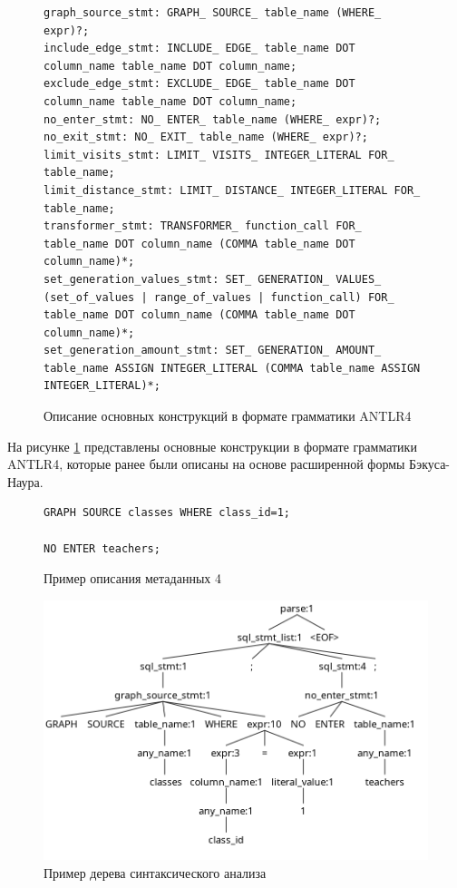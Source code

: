 \begin{figure}
  \begin{lstlisting}
graph_source_stmt: GRAPH_ SOURCE_ table_name (WHERE_ expr)?;
include_edge_stmt: INCLUDE_ EDGE_ table_name DOT column_name table_name DOT column_name;
exclude_edge_stmt: EXCLUDE_ EDGE_ table_name DOT column_name table_name DOT column_name;
no_enter_stmt: NO_ ENTER_ table_name (WHERE_ expr)?;
no_exit_stmt: NO_ EXIT_ table_name (WHERE_ expr)?;
limit_visits_stmt: LIMIT_ VISITS_ INTEGER_LITERAL FOR_ table_name;
limit_distance_stmt: LIMIT_ DISTANCE_ INTEGER_LITERAL FOR_ table_name;
transformer_stmt: TRANSFORMER_ function_call FOR_ table_name DOT column_name (COMMA table_name DOT column_name)*;
set_generation_values_stmt: SET_ GENERATION_ VALUES_ (set_of_values | range_of_values | function_call) FOR_ table_name DOT column_name (COMMA table_name DOT column_name)*;
set_generation_amount_stmt: SET_ GENERATION_ AMOUNT_ table_name ASSIGN INTEGER_LITERAL (COMMA table_name ASSIGN INTEGER_LITERAL)*;
  \end{lstlisting}
  \caption{Описание основных конструкций в формате грамматики ANTLR4}
  \label{antlr4-grammar}
\end{figure}

На рисунке \ref{antlr4-grammar} представлены основные конструкции в формате грамматики ANTLR4, которые ранее были описаны на основе расширенной формы Бэкуса-Наура.

\begin{figure}
  \begin{lstlisting}
GRAPH SOURCE classes WHERE class_id=1;

NO ENTER teachers;
  \end{lstlisting}
  \caption{Пример описания метаданных 4}
  \label{metadata-example-4}
\end{figure}

\begin{figure}
  \includegraphics[scale=0.5]{./img/antlr4-parse-tree.png}
  \caption{Пример дерева синтаксического анализа}
  \label{antlr4-parse-tree}
\end{figure}

